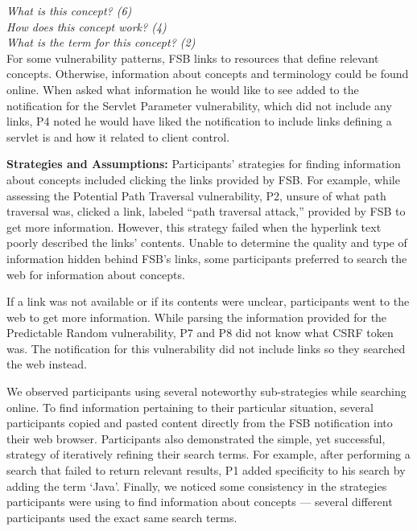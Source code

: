 \documentclass[10pt,journal,compsoc]{IEEEtran}
\begin{document}
\noindent\emph{What is this concept? (6)} \\
\emph{How does this concept work? (4)} \\
\emph{What is the term for this concept? (2)}
\\


For some vulnerability patterns, FSB links to resources that define relevant concepts.
Otherwise, information about concepts and terminology could be found online.
When asked what information he would like to see added to the notification for the Servlet Parameter vulnerability, which did not include any links, P4 noted he would have liked the notification to include links defining a servlet is and how it related to client control.


\textbf{Strategies and Assumptions:}
Participants' strategies for finding information about concepts included clicking the links provided by FSB.
For example, while assessing the Potential Path Traversal vulnerability, P2, unsure of what path traversal was, clicked a link, labeled ``path traversal attack,'' provided by FSB to get more information.
However, this strategy failed when the hyperlink text poorly described the links' contents.
Unable to determine the quality and type of information hidden behind FSB's links, some participants preferred to search the web for information about concepts.

If a link was not available or if its contents were unclear, participants went to the web to get more information.
While parsing the information provided for the Predictable Random vulnerability, P7 and P8 did not know what CSRF token was.
The notification for this vulnerability did not include links so they searched the web instead. 

We observed participants using several noteworthy sub-strategies while searching online.
To find information pertaining to their particular situation, several participants copied and pasted content directly from the FSB notification into their web browser.
Participants also demonstrated the simple, yet successful, strategy of iteratively refining their search terms. 
For example, after performing a search that failed to return relevant results, P1 added specificity to his search by adding the term `Java'.
Finally, we noticed some consistency in the strategies participants were using to find information about concepts --- several different participants used the exact same search terms. 
\end{document}
